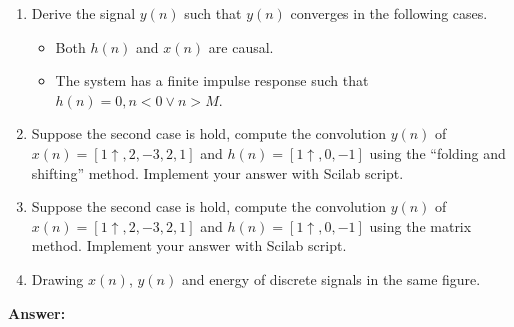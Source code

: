 \documentclass[12pt,a4paper]{article}
\begin{document}
\begin{enumerate}
    \item Derive the signal $y(n)$ such that $y(n)$ converges in the following cases.
    \begin{itemize}
        \item Both $h(n)$ and $x(n)$ are causal.
        \item The system has a finite impulse response such that $h(n) = 0, n < 0 \lor n > M$.
    \end{itemize}
    \item Suppose the second case is hold, compute the convolution $y(n)$ of $x(n) = [1 \uparrow, 2, -3, 2, 1]$ and $h(n) = [1 \uparrow, 0, -1]$ using the ``folding and shifting'' method. Implement your answer with Scilab script.
    \item Suppose the second case is hold, compute the convolution $y(n)$ of $x(n) = [1 \uparrow, 2, -3, 2, 1]$ and $h(n) = [1 \uparrow, 0, -1]$ using the matrix method. Implement your answer with Scilab script.
    \item Drawing $x(n)$, $y(n)$ and energy of discrete signals in the same figure.
\end{enumerate}
\noindent\textbf{Answer:}
\end{document}

